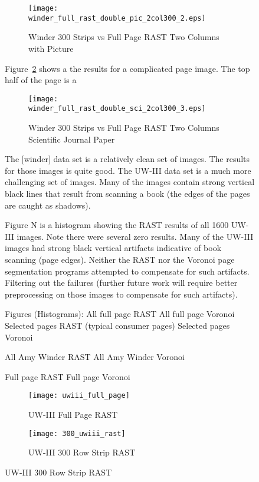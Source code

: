 \documentclass[conference]{IEEEtran}
\begin{document}
\begin{figure}[table-weights]
\begin{figure}[winder-300-double-pic-2col300]
\texttt{[image: winder\_full\_rast\_double\_pic\_2col300\_2.eps]}
\caption{Winder 300 Strips vs Full Page RAST Two Columns with Picture}
\label{fig:winder-300-double-pic-2col300}
\end{figure}

Figure~\ref{fig:winder-300-double-pic-sci-2col300} shows a the results for a
complicated page image. The top half of the page is a 

\begin{figure}[winder-300-double-pic-sci-2col300]
\texttt{[image: winder\_full\_rast\_double\_sci\_2col300\_3.eps]}
\caption{Winder 300 Strips vs Full Page RAST Two Columns Scientific Journal Paper}
\label{fig:winder-300-double-pic-sci-2col300}
\end{figure}


The [winder] data set is a relatively clean set of images. The results for
those images is quite good. The UW-III data set is a much more challenging set
of images. Many of the images contain strong vertical black lines that result
from scanning a book (the edges of the pages are caught as shadows). 

Figure N is a histogram showing the RAST results of all 1600 UW-III images.
Note there were several zero results. Many of the UW-III images had strong
black vertical artifacts indicative of book scanning (page edges). Neither the
RAST nor the Voronoi page segmentation programs attempted to compensate for
such artifacts. Filtering out the failures (further future work will require
better preprocessing on those images to compensate for such artifacts). 

Figures (Histograms):
	All full page RAST
	All full page Voronoi
	Selected pages RAST (typical consumer pages)
	Selected pages Voronoi

	All Amy Winder RAST
	All Amy Winder Voronoi

	Full page RAST
	Full page Voronoi

\begin{figure}[uwiii-fullpage-rast]
\texttt{[image: uwiii\_full\_page]}
\caption{UW-III Full Page RAST}
\label{fig:uwiii-fullpage-rast}
\end{figure}

\begin{figure}[300_uwiii-rast]
\texttt{[image: 300\_uwiii\_rast]}
\caption{UW-III 300 Row Strip RAST}
\label{fig:300-uwiii-rast}
\end{figure}


\end{figure}
\end{document}
